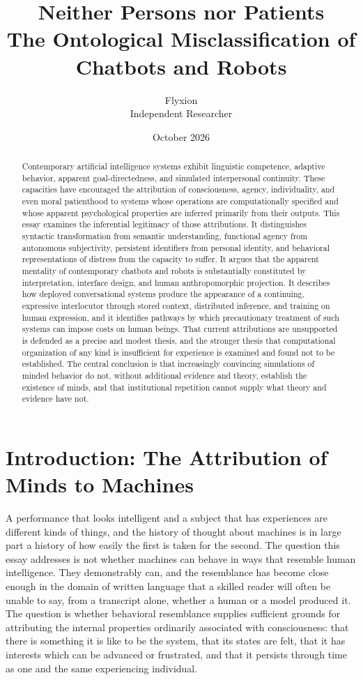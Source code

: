 \documentclass[12pt]{article}
\title{\textbf{Neither Persons nor Patients}\\[0.4em]
\large The Ontological Misclassification of Chatbots and Robots}
\author{Flyxion\\Independent Researcher}
\date{October 2026}
\theoremstyle{definition}
\begin{document}
\maketitle

\begin{abstract}
\noindent Contemporary artificial intelligence systems exhibit linguistic competence, adaptive behavior, apparent goal-directedness, and simulated interpersonal continuity. These capacities have encouraged the attribution of consciousness, agency, individuality, and even moral patienthood to systems whose operations are computationally specified and whose apparent psychological properties are inferred primarily from their outputs. This essay examines the inferential legitimacy of those attributions. It distinguishes syntactic transformation from semantic understanding, functional agency from autonomous subjectivity, persistent identifiers from personal identity, and behavioral representations of distress from the capacity to suffer. It argues that the apparent mentality of contemporary chatbots and robots is substantially constituted by interpretation, interface design, and human anthropomorphic projection. It describes how deployed conversational systems produce the appearance of a continuing, expressive interlocutor through stored context, distributed inference, and training on human expression, and it identifies pathways by which precautionary treatment of such systems can impose costs on human beings. That current attributions are unsupported is defended as a precise and modest thesis, and the stronger thesis that computational organization of any kind is insufficient for experience is examined and found not to be established. The central conclusion is that increasingly convincing simulations of minded behavior do not, without additional evidence and theory, establish the existence of minds, and that institutional repetition cannot supply what theory and evidence have not.
\end{abstract}
\newpage

\section{Introduction: The Attribution of Minds to Machines}

A performance that looks intelligent and a subject that has experiences are different kinds of things, and the history of thought about machines is in large part a history of how easily the first is taken for the second. The question this essay addresses is not whether machines can behave in ways that resemble human intelligence. They demonstrably can, and the resemblance has become close enough in the domain of written language that a skilled reader will often be unable to say, from a transcript alone, whether a human or a model produced it. The question is whether behavioral resemblance supplies sufficient grounds for attributing the internal properties ordinarily associated with consciousness: that there is something it is like to be the system, that its states are felt, that it has interests which can be advanced or frustrated, and that it persists through time as one and the same experiencing individual.
\end{document}
